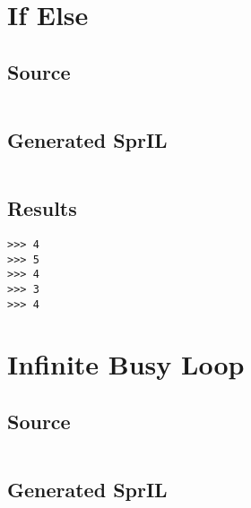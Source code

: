 \documentclass[twoside]{report}
\begin{document}
\section{If Else}
\subsection{Source}
\inputminted[tabsize=4,linenos,firstnumber=1]{text}{../test/ifelse.shl}
\subsection{Generated SprIL}
\inputminted[tabsize=4,linenos,firstnumber=0]{text}{../test/ifelse_gen.txt}
\subsection{Results}
\begin{verbatim}
>>> 4
>>> 5
>>> 4
>>> 3
>>> 4
\end{verbatim}

\section{Infinite Busy Loop}
\subsection{Source}
\inputminted[tabsize=4,linenos,firstnumber=1]{text}{../test/infinite_busy_loop.shl}
\subsection{Generated SprIL}
\inputminted[tabsize=4,linenos,firstnumber=0]{text}{../test/infinite_busy_loop_gen.txt}
\end{document}
